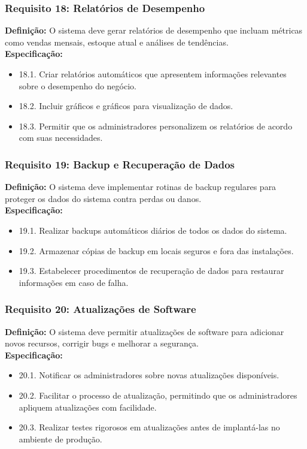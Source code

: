 \subsubsection{Requisito 18: Relatórios de Desempenho}
\textbf{Definição:} O sistema deve gerar relatórios de desempenho que incluam métricas como vendas mensais, estoque atual e análises de tendências.
\\
\textbf{Especificação:}
\begin{itemize}
	\item 18.1. Criar relatórios automáticos que apresentem informações relevantes sobre o desempenho do negócio.
	\item 18.2. Incluir gráficos e gráficos para visualização de dados.
	\item 18.3. Permitir que os administradores personalizem os relatórios de acordo com suas necessidades.
\end{itemize}

\subsubsection{Requisito 19: Backup e Recuperação de Dados}
\textbf{Definição:} O sistema deve implementar rotinas de backup regulares para proteger os dados do sistema contra perdas ou danos.
\\
\textbf{Especificação:}
\begin{itemize}
	\item 19.1. Realizar backups automáticos diários de todos os dados do sistema.
	\item 19.2. Armazenar cópias de backup em locais seguros e fora das instalações.
	\item 19.3. Estabelecer procedimentos de recuperação de dados para restaurar informações em caso de falha.
\end{itemize}

\subsubsection{Requisito 20: Atualizações de Software}
\textbf{Definição:} O sistema deve permitir atualizações de software para adicionar novos recursos, corrigir bugs e melhorar a segurança.
\\
\textbf{Especificação:}
\begin{itemize}
	\item 20.1. Notificar os administradores sobre novas atualizações disponíveis.
	\item 20.2. Facilitar o processo de atualização, permitindo que os administradores apliquem atualizações com facilidade.
	\item 20.3. Realizar testes rigorosos em atualizações antes de implantá-las no ambiente de produção.
\end{itemize}

